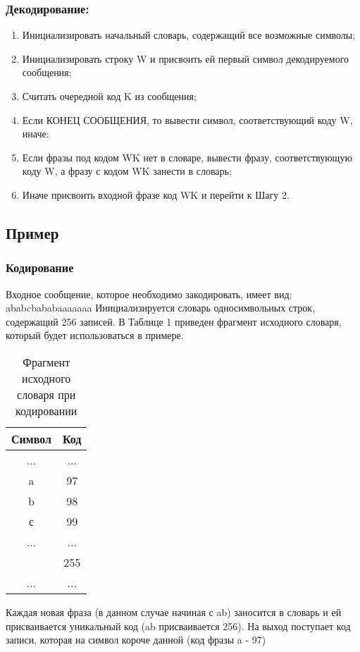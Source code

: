 \documentclass[a4paper]{article}
\begin{document}
\subsubsection{Декодирование:}
\begin{enumerate}
\item Инициализировать начальный словарь, содержащий все возможные символы;
\item Инициализировать строку W и присвоить ей первый символ декодируемого сообщения;
\item Считать очередной код K из сообщения;
\item Если КОНЕЦ СООБЩЕНИЯ, то вывести символ, соответствующий коду W, иначе:
\item Если фразы под кодом WK нет в словаре, вывести фразу, соответствующую коду W, а фразу с кодом WK занести в словарь;
\item Иначе присвоить входной фразе код WK и перейти к Шагу 2.
\end{enumerate}

\newpage
\subsection{Пример}
\subsubsection{Кодирование}
Входное сообщение, которое необходимо закодировать, имеет вид:
ababcbababaaaaaaa
Инициализируется словарь односимвольных строк, содержащий 256 записей. В Таблице 1 приведен фрагмент исходного словаря, который будет использоваться в примере. 
\begin{table}[h]
\centering
\begin{tabular}{ |c|c| } 
\hline
 Символ & Код\\
 \hline\hline
 ... & ... \\
\hline
 a & 97  \\
 \hline
 b & 98  \\
 \hline
 с & 99  \\
\hline
 ... & ... \\
\hline
 & 255 \\
\hline
 ... & ... \\
\hline
\end{tabular}
\caption{\label{tab:widgets}Фрагмент исходного словаря при кодировании}
\end{table}

Каждая новая фраза (в данном случае начиная с ab) заносится в словарь и ей присваивается уникальный код (ab присваивается 256). На выход поступает код записи, которая на символ короче данной (код фразы a - 97)
\end{document}
